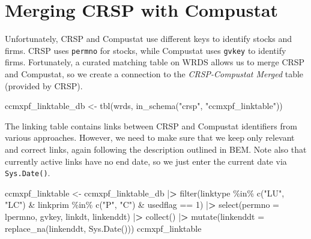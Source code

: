 \documentclass[
]{book}
\newenvironment{Shaded}{\begin{snugshade}}{\end{snugshade}}
\newcommand{\AttributeTok}[1]{\textcolor[rgb]{0.61,0.61,0.61}{#1}}
\newcommand{\DecValTok}[1]{\textcolor[rgb]{0.06,0.06,0.06}{#1}}
\newcommand{\ErrorTok}[1]{\textcolor[rgb]{0.14,0.14,0.14}{\textbf{#1}}}
\newcommand{\FunctionTok}[1]{\textcolor[rgb]{0,0,0}{#1}}
\newcommand{\NormalTok}[1]{#1}
\newcommand{\OtherTok}[1]{\textcolor[rgb]{0.37,0.37,0.37}{#1}}
\newcommand{\SpecialCharTok}[1]{\textcolor[rgb]{0,0,0}{#1}}
\newcommand{\StringTok}[1]{\textcolor[rgb]{0.5,0.5,0.5}{#1}}
\begin{document}
\hypertarget{merging-crsp-with-compustat}{%
\section{Merging CRSP with Compustat}\label{merging-crsp-with-compustat}}

Unfortunately, CRSP and Compustat use different keys to identify stocks and firms. CRSP uses \texttt{permno} for stocks, while Compustat uses \texttt{gvkey} to identify firms. Fortunately, a curated matching table on WRDS allows us to merge CRSP and Compustat, so we create a connection to the \emph{CRSP-Compustat Merged} table (provided by CRSP).

\begin{Shaded}
\begin{Highlighting}[]
\NormalTok{ccmxpf\_linktable\_db }\OtherTok{\textless{}{-}} \FunctionTok{tbl}\NormalTok{(wrds, }
                           \FunctionTok{in\_schema}\NormalTok{(}\StringTok{"crsp"}\NormalTok{, }\StringTok{"ccmxpf\_linktable"}\NormalTok{))}
\end{Highlighting}
\end{Shaded}

The linking table contains links between CRSP and Compustat identifiers from various approaches. However, we need to make sure that we keep only relevant and correct links, again following the description outlined in BEM. Note also that currently active links have no end date, so we just enter the current date via \texttt{Sys.Date()}.

\begin{Shaded}
\begin{Highlighting}[]
\NormalTok{ccmxpf\_linktable }\OtherTok{\textless{}{-}}\NormalTok{ ccmxpf\_linktable\_db }\SpecialCharTok{|}\ErrorTok{\textgreater{}}
  \FunctionTok{filter}\NormalTok{(linktype }\SpecialCharTok{\%in\%} \FunctionTok{c}\NormalTok{(}\StringTok{"LU"}\NormalTok{, }\StringTok{"LC"}\NormalTok{) }\SpecialCharTok{\&}
\NormalTok{    linkprim }\SpecialCharTok{\%in\%} \FunctionTok{c}\NormalTok{(}\StringTok{"P"}\NormalTok{, }\StringTok{"C"}\NormalTok{) }\SpecialCharTok{\&}
\NormalTok{    usedflag }\SpecialCharTok{==} \DecValTok{1}\NormalTok{) }\SpecialCharTok{|}\ErrorTok{\textgreater{}}
  \FunctionTok{select}\NormalTok{(}\AttributeTok{permno =}\NormalTok{ lpermno, gvkey, linkdt, linkenddt) }\SpecialCharTok{|}\ErrorTok{\textgreater{}}
  \FunctionTok{collect}\NormalTok{() }\SpecialCharTok{|}\ErrorTok{\textgreater{}}
  \FunctionTok{mutate}\NormalTok{(}\AttributeTok{linkenddt =} \FunctionTok{replace\_na}\NormalTok{(linkenddt, }\FunctionTok{Sys.Date}\NormalTok{()))}
\NormalTok{ccmxpf\_linktable}
\end{Highlighting}
\end{Shaded}
\end{document}
